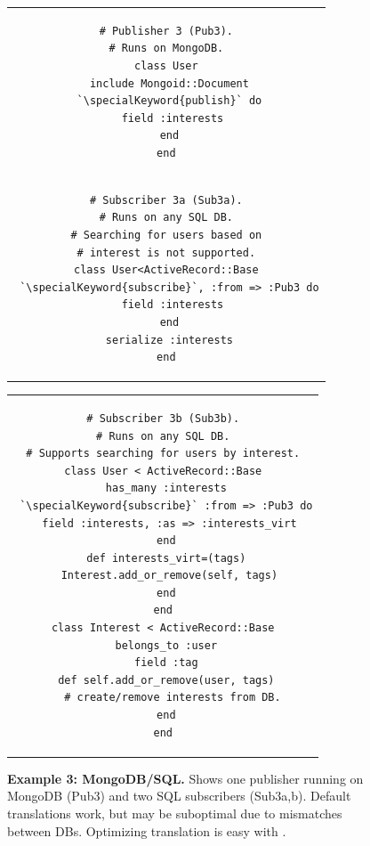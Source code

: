 \begin{figure}[t]
\begin{tabular}{c}
\begin{minipage}{.19\textwidth}
\vspace{-7pt}
\begin{lstlisting}[xleftmargin=1pt,framexleftmargin=1pt]
# Publisher 3 (Pub3).
# Runs on MongoDB.
class User
 include Mongoid::Document
 `\specialKeyword{publish}` do
  field :interests
 end
end
\end{lstlisting}
\end{minipage}\vspace{-8pt}\\
\begin{minipage}{.19\textwidth}
\begin{lstlisting}[xleftmargin=1pt,framexleftmargin=1pt]
# Subscriber 3a (Sub3a).
# Runs on any SQL DB.
# Searching for users based on
# interest is not supported.
class User<ActiveRecord::Base
 `\specialKeyword{subscribe}`, :from => :Pub3 do
  field :interests
 end
 serialize :interests
end
\end{lstlisting}
\end{minipage}\vspace{-8pt}\hfill
\end{tabular}
\begin{tabular}{c}
\begin{minipage}{.24\textwidth}
\begin{lstlisting}[xleftmargin=1pt,framexleftmargin=1pt]
# Subscriber 3b (Sub3b).
# Runs on any SQL DB.
# Supports searching for users by interest.
class User < ActiveRecord::Base
 has_many :interests
 `\specialKeyword{subscribe}` :from => :Pub3 do
  field :interests, :as => :interests_virt
 end
 def interests_virt=(tags)
  Interest.add_or_remove(self, tags)
 end
end
class Interest < ActiveRecord::Base
 belongs_to :user
 field :tag
 def self.add_or_remove(user, tags)
   # create/remove interests from DB.
 end
end
\end{lstlisting}
\end{minipage}
\end{tabular}
\vspace{-6pt}
\caption{{\bf Example 3: MongoDB/SQL.}
Shows one publisher running on MongoDB (Pub3) and two SQL subscribers
(Sub3a,b).  Default translations work, but may be suboptimal due to
mismatches between DBs.  Optimizing translation is easy with \synapse.
}
\label{fig:mongo-sql}
\vspace{-6pt}
\end{figure}

